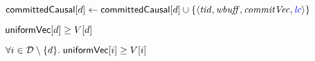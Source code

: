 \begin{algorithm*}[t]
\begin{algorithmic}[1]
      \State ${\sf committedCausal}[d] \gets {\sf committedCausal}[d] \cup
        \{\langle \mathit{tid}, \mathit{wbuff}, \mathit{commitVec}, \textcolor{blue}{\mathit{lc}} \rangle\}$
        \label{line:commit-committedcausal}
    \EndWhenRcv

    \Statex
    \Function{\uniformbarrier}{$\vc$} \label{line:function-uniformbarrier}
      \State \wait\until ${\sf uniformVec}[d] \ge V[d]$
        \label{line:uniformbarrier-wait-uniformvc-d}
    \EndFunction

    \Statex
    \Function{\attach}{$\vc$}
      \label{line:function-attach}
      \State \wait\until $\forall i \in \mathcal{D} \setminus \{d\}.\; {\sf uniformVec}[i] \ge V[i]$
        \label{line:attach-wait-condition}
    \EndFunction
  \end{algorithmic}
\end{algorithm*}